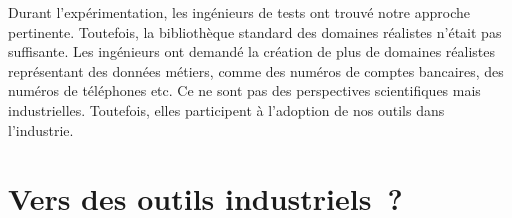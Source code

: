 Durant l'expérimentation, les ingénieurs de tests ont trouvé notre approche
pertinente. Toutefois, la bibliothèque standard des domaines réalistes n'était
pas suffisante. Les ingénieurs ont demandé la création de plus de domaines
réalistes représentant des données métiers, comme des numéros de comptes
bancaires, des numéros de téléphones etc. Ce ne sont pas des perspectives
scientifiques mais industrielles. Toutefois, elles participent à l'adoption de
nos outils dans l'industrie.

\section{Vers des outils industriels~?}
